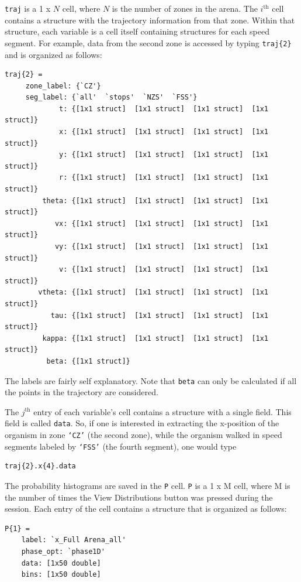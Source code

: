 \documentclass[letterpaper, 11pt]{article}
\begin{document}
\noindent\texttt{traj} is a 1 x $N$ cell, where $N$ is the number of zones in the arena.  The
$i^{\text{th}}$ cell contains a structure with the trajectory information from that zone.  Within
that structure, each variable is a cell itself containing structures for each speed segment. For
example, data from the second zone is accessed by typing \texttt{traj\{2\}} and is organized as
follows:
\begin{verbatim}
traj{2} =
     zone_label: {`CZ'}
     seg_label: {`all'  `stops'  `NZS'  `FSS'}
             t: {[1x1 struct]  [1x1 struct]  [1x1 struct]  [1x1 struct]}
             x: {[1x1 struct]  [1x1 struct]  [1x1 struct]  [1x1 struct]}
             y: {[1x1 struct]  [1x1 struct]  [1x1 struct]  [1x1 struct]}
             r: {[1x1 struct]  [1x1 struct]  [1x1 struct]  [1x1 struct]}
         theta: {[1x1 struct]  [1x1 struct]  [1x1 struct]  [1x1 struct]}
            vx: {[1x1 struct]  [1x1 struct]  [1x1 struct]  [1x1 struct]}
            vy: {[1x1 struct]  [1x1 struct]  [1x1 struct]  [1x1 struct]}
             v: {[1x1 struct]  [1x1 struct]  [1x1 struct]  [1x1 struct]}
        vtheta: {[1x1 struct]  [1x1 struct]  [1x1 struct]  [1x1 struct]}
           tau: {[1x1 struct]  [1x1 struct]  [1x1 struct]  [1x1 struct]}
         kappa: {[1x1 struct]  [1x1 struct]  [1x1 struct]  [1x1 struct]}
          beta: {[1x1 struct]}
\end{verbatim}
The labels are fairly self explanatory. Note that \texttt{beta} can only be calculated if all the
points in the trajectory are considered.

The $j^{\text{th}}$ entry of each variable's cell contains a structure with a single field.  This
field is called \texttt{data}.  So, if one is interested in extracting the x-position of the
organism in zone \texttt{`CZ'} (the second zone), while the organism walked in speed segments
labeled by \texttt{`FSS'} (the fourth segment), one would type

\begin{verbatim}
traj{2}.x{4}.data
\end{verbatim}

The probability histograms are saved in the \texttt{P} cell.  \texttt{P} is a 1 x M cell, where M
is the number of times the View Distributions button was pressed during the session.  Each entry of
the cell contains a structure that is organized as follows:
\begin{verbatim}
P{1} =
    label: `x_Full Arena_all'
    phase_opt: `phase1D'
    data: [1x50 double]
    bins: [1x50 double]
\end{verbatim}
\end{document}
